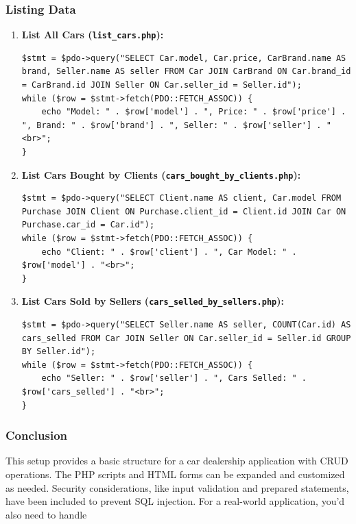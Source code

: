 \documentclass[11pt]{article}
\begin{document}
\subsubsection{Listing Data}
\label{sec:org27c4347}
\begin{enumerate}
\item \textbf{List All Cars (\texttt{list\_cars.php}):}

\begin{verbatim}
$stmt = $pdo->query("SELECT Car.model, Car.price, CarBrand.name AS brand, Seller.name AS seller FROM Car JOIN CarBrand ON Car.brand_id = CarBrand.id JOIN Seller ON Car.seller_id = Seller.id");
while ($row = $stmt->fetch(PDO::FETCH_ASSOC)) {
    echo "Model: " . $row['model'] . ", Price: " . $row['price'] . ", Brand: " . $row['brand'] . ", Seller: " . $row['seller'] . "<br>";
}
\end{verbatim}

\item \textbf{List Cars Bought by Clients (\texttt{cars\_bought\_by\_clients.php}):}

\begin{verbatim}
$stmt = $pdo->query("SELECT Client.name AS client, Car.model FROM Purchase JOIN Client ON Purchase.client_id = Client.id JOIN Car ON Purchase.car_id = Car.id");
while ($row = $stmt->fetch(PDO::FETCH_ASSOC)) {
    echo "Client: " . $row['client'] . ", Car Model: " . $row['model'] . "<br>";
}
\end{verbatim}

\item \textbf{List Cars Sold by Sellers (\texttt{cars\_selled\_by\_sellers.php}):}

\begin{verbatim}
$stmt = $pdo->query("SELECT Seller.name AS seller, COUNT(Car.id) AS cars_selled FROM Car JOIN Seller ON Car.seller_id = Seller.id GROUP BY Seller.id");
while ($row = $stmt->fetch(PDO::FETCH_ASSOC)) {
    echo "Seller: " . $row['seller'] . ", Cars Selled: " . $row['cars_selled'] . "<br>";
}
\end{verbatim}
\end{enumerate}

\subsubsection{Conclusion}
\label{sec:orgfcceb37}
This setup provides a basic structure for a car dealership application
with CRUD operations. The PHP scripts and HTML forms can be expanded and
customized as needed. Security considerations, like input validation and
prepared statements, have been included to prevent SQL injection. For a
real-world application, you'd also need to handle
\end{document}
